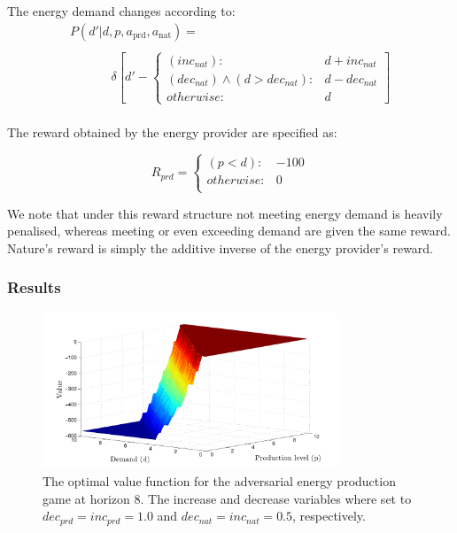 The energy demand changes according to:
{\small 
\abovedisplayskip=15pt
\belowdisplayskip=0pt
\begin{align*}
&P(d' | d, p, a_{\text{prd}}, a_{\text{nat}}) = \\
\\
& \hspace{40pt}\delta \left[ d' - \begin{cases}
      (inc_{nat})  : & d + inc_{nat} \\
       (dec_{nat}) \wedge (d > dec_{nat}) : & d - dec_{nat} \\
      otherwise: & d
    \end{cases} \right] & \\    
\end{align*}
}%

The reward obtained by the energy provider are specified as:

{\small 
\abovedisplayshortskip=0pt
\belowdisplayshortskip=0pt
\begin{equation}
  R_{prd} = 
    \begin{cases}
      (p < d) : & -100 \\ 
      otherwise : & 0 \\ 
    \end{cases} \nonumber
\end{equation}
}%

We note that under this reward structure not meeting energy demand
is heavily penalised, whereas meeting or even exceeding demand are
given the same reward. Nature's reward is simply the additive inverse 
of the energy provider's reward.

\subsubsection{Results}


\begin{figure}[ht!]
\includegraphics[width=250pt]{sep.pdf}
\vspace{-3mm}
\caption{The optimal value function for the adversarial energy production game at horizon 8. 
The increase and decrease variables where set to $dec_{prd} = inc_{prd} = 1.0$ and $dec_{nat} = inc_{nat} = 0.5$, respectively.}
\label{fig:sepvfunc}
\end{figure}

